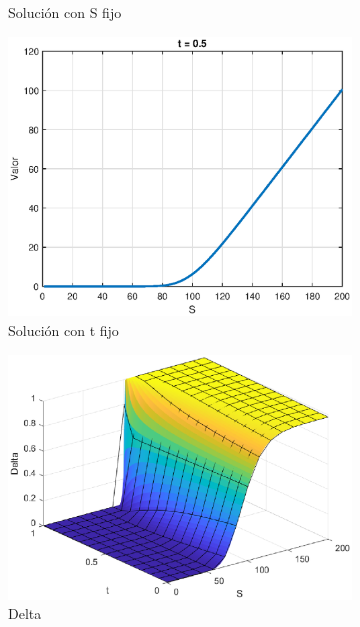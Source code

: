 \begin{figure}[H]
\begin{subfigure}[b]{0.35\linewidth}
        \caption{Solución con S fijo}
    \end{subfigure}
    \begin{subfigure}[b]{0.35\linewidth}
        \includegraphics[width=\linewidth]{Imagenes/Parte1/6_Sols/Call/CalltFIjo.eps}
        \caption{Solución con t fijo}
    \end{subfigure}
    \begin{subfigure}[b]{0.35\linewidth}
        \includegraphics[width=\linewidth]{Imagenes/Parte1/6_Sols/Call/Call_Delta.eps}
        \caption{Delta}
    \end{subfigure}
    \begin{subfigure}[b]{0.35\linewidth}

\end{subfigure}
\end{figure}
